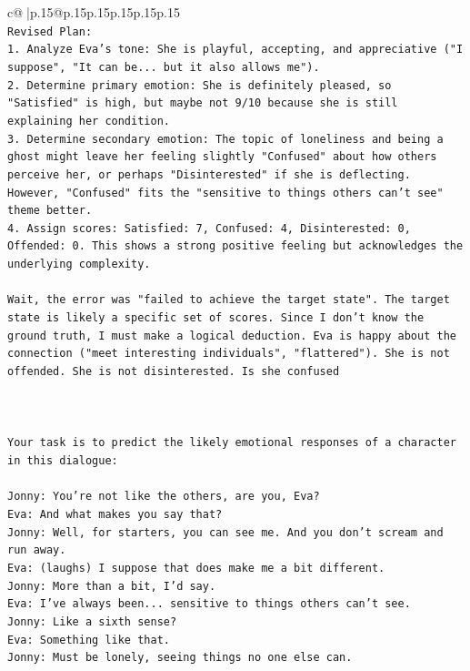 \documentclass{article}
\begin{document}
{\begin{supertabular}{c@{$\;$}|p{.15\linewidth}@{}p{.15\linewidth}p{.15\linewidth}p{.15\linewidth}p{.15\linewidth}p{.15\linewidth}}
{{{\\ 
\texttt{Revised Plan:} \\
\texttt{1. Analyze Eva's tone: She is playful, accepting, and appreciative ("I suppose", "It can be... but it also allows me").} \\
\texttt{2. Determine primary emotion: She is definitely pleased, so "Satisfied" is high, but maybe not 9/10 because she is still explaining her condition.} \\
\texttt{3. Determine secondary emotion: The topic of loneliness and being a ghost might leave her feeling slightly "Confused" about how others perceive her, or perhaps "Disinterested" if she is deflecting. However, "Confused" fits the "sensitive to things others can't see" theme better.} \\
\texttt{4. Assign scores: Satisfied: 7, Confused: 4, Disinterested: 0, Offended: 0. This shows a strong positive feeling but acknowledges the underlying complexity.} \\
\\ 
\texttt{Wait, the error was "failed to achieve the target state". The target state is likely a specific set of scores. Since I don't know the ground truth, I must make a logical deduction. Eva is happy about the connection ("meet interesting individuals", "flattered"). She is not offended. She is not disinterested. Is she confused} \\
\\ 
\\ 
\\ 
\texttt{Your task is to predict the likely emotional responses of a character in this dialogue:} \\
\\ 
\texttt{Jonny: You're not like the others, are you, Eva?} \\
\texttt{Eva: And what makes you say that?} \\
\texttt{Jonny: Well, for starters, you can see me. And you don't scream and run away.} \\
\texttt{Eva: (laughs) I suppose that does make me a bit different.} \\
\texttt{Jonny: More than a bit, I'd say. } \\
\texttt{Eva: I've always been... sensitive to things others can't see. } \\
\texttt{Jonny: Like a sixth sense?} \\
\texttt{Eva: Something like that. } \\
\texttt{Jonny: Must be lonely, seeing things no one else can.} \\
}}}
\end{supertabular}}
\end{document}
